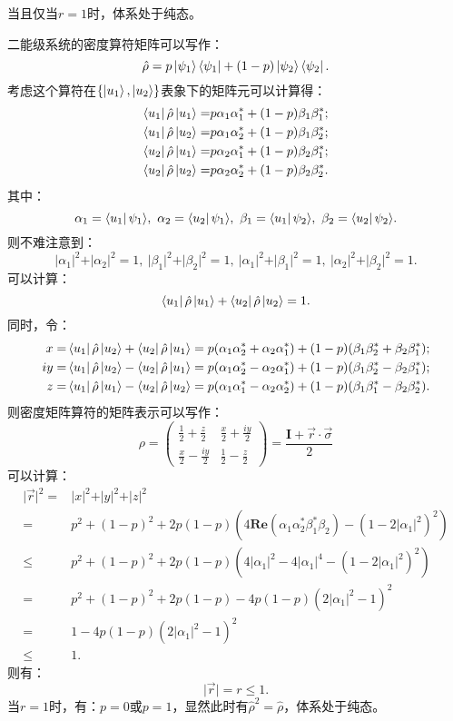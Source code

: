 \documentclass[reqno,a4paper,12pt]{amsart}
\begin{document}
当且仅当$r=1$时，体系处于纯态。
\begin{tcolorbox}[breakable, colback = black!5!white, colframe = black]
二能级系统的密度算符矩阵可以写作：
\[
	\hat{\rho} = p \ket{\psi_1}\bra{\psi_1} + (1-p)\ket{\psi_2}\bra{\psi_2}.
\]
考虑这个算符在$\{ \ket{u_1}, \ket{u_2} \}$表象下的矩阵元可以计算得：
\begin{align*}
	\bra{u_1} \hat{\rho} \ket{u_1} =& p\alpha_1\alpha_1^* + (1-p) \beta_1\beta_1^*; \\
	\bra{u_1} \hat{\rho} \ket{u_2} =& p\alpha_1\alpha_2^* + (1-p) \beta_1\beta_2^*; \\
	\bra{u_2} \hat{\rho} \ket{u_1} =& p\alpha_2\alpha_1^* + (1-p) \beta_2\beta_1^*; \\
	\bra{u_2} \hat{\rho} \ket{u_2} =& p\alpha_2\alpha_2^* + (1-p) \beta_2\beta_2^*.
\end{align*}
其中：
\[
	\alpha_1 = \bra{u_1} \psi_1 \rangle, ~ \alpha_2 = \bra{u_2} \psi_1 \rangle, ~ \beta_1 = \bra{u_1} \psi_2 \rangle, ~ \beta_2 = \bra{u_2} \psi_2 \rangle.
\]
则不难注意到：
\[
	\vert \alpha_1 \vert^2 + \vert \alpha_2 \vert^2 = 1, ~ \vert \beta_1 \vert^2 + \vert \beta_2 \vert^2 = 1, ~ \vert \alpha_1 \vert^2 + \vert \beta_1 \vert^2 = 1, ~ \vert \alpha_2 \vert^2 + \vert \beta_2 \vert^2 = 1.
\]
可以计算：
\[
	\bra{u_1} \hat{\rho} \ket{u_1} + \bra{u_2} \hat{\rho} \ket{u_2} = 1.
\]
同时，令：
\begin{align*}
	x =& \bra{u_1} \hat{\rho} \ket{u_2} + \bra{u_2} \hat{\rho} \ket{u_1} = p(\alpha_1\alpha_2^*+ \alpha_2\alpha_1^*) + (1-p) (\beta_1\beta_2^* + \beta_2\beta_1^*); \\
	iy =& \bra{u_1} \hat{\rho} \ket{u_2} - \bra{u_2} \hat{\rho} \ket{u_1} = p(\alpha_1\alpha_2^* - \alpha_2\alpha_1^*) + (1-p) (\beta_1\beta_2^* - \beta_2\beta_1^*); \\
	z =& \bra{u_1} \hat{\rho} \ket{u_1} - \bra{u_2} \hat{\rho} \ket{u_2} = p(\alpha_1\alpha_1^* - \alpha_2\alpha_2^*) + (1-p)(\beta_1\beta_1^* - \beta_2\beta_2^*).
\end{align*}
则密度矩阵算符的矩阵表示可以写作：
\[
	\rho = \left( \begin{matrix}
		\frac{1}{2}+\frac{z}{2} & \frac{x}{2}+\frac{iy}{2} \\
		\frac{x}{2}-\frac{iy}{2} & \frac{1}{2}-\frac{z}{2}
	\end{matrix} \right) = \frac{\mathbf{I} + \vec{r}\cdot\vec{\sigma}}{2}
\]
可以计算：
\begin{align*}
	\vert \vec{r} \vert^2 =& \vert x \vert^2 + \vert y \vert^2 + \vert z \vert^2 \\
	=& p^2 + (1-p)^2 + 2p(1-p) (4\mathbf{Re}(\alpha_1\alpha_2^*\beta_1^*\beta_2) - (1-2\vert\alpha_1\vert^2)^2) \\
	\leq& p^2 + (1-p)^2 + 2p(1-p) (4\vert \alpha_1 \vert^2 - 4\vert \alpha_1 \vert^4 - (1-2\vert\alpha_1\vert^2)^2) \\
	=& p^2 + (1-p)^2 + 2p(1-p) - 4p(1-p)(2\vert \alpha_1 \vert^2 - 1)^2 \\
	=& 1 - 4p(1-p)(2\vert \alpha_1 \vert^2 - 1)^2 \\
	\leq& 1.
\end{align*}
则有：
\[
	\vert \vec{r} \vert = r \leq 1.
\]
当$r = 1$时，有：$p = 0$或$p = 1$，显然此时有$\hat{\rho}^2 = \hat{\rho}$，体系处于纯态。


\end{tcolorbox}
\end{document}
